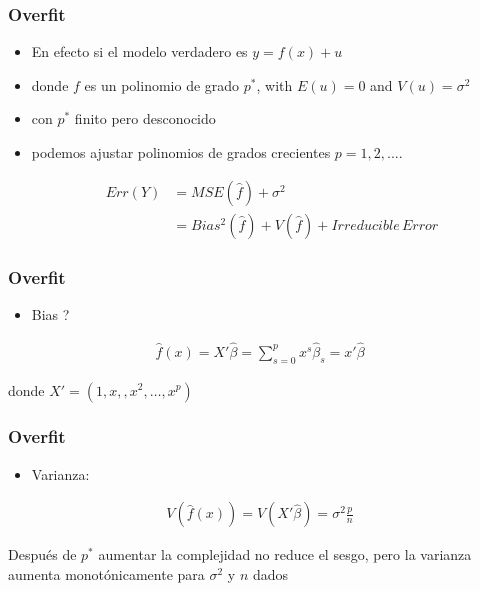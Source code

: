 \documentclass[
  shownotes,
  xcolor={svgnames},
  hyperref={colorlinks,citecolor=DarkBlue,linkcolor=DarkRed,urlcolor=DarkBlue}
  , aspectratio=169]{beamer}
\begin{document}
\begin{frame}[fragile]
\frametitle{Overfit}


\begin{itemize}

  \item En efecto si el modelo verdadero es $y=f(x) +u$ 
  \medskip
  \item donde $f$ es un polinomio de grado $p^*$, with $E(u)=0$ and $V(u)=\sigma^2$
  \medskip
  \item con $p^*$ finito pero desconocido
  \medskip
  \item  podemos ajustar polinomios de grados crecientes $p=1,2,....$
  
  \begin{align}
  Err (  Y )  &= MSE(\hat f) + \sigma^2  \\
                 &= Bias^2(\hat f) + V(\hat f)  + Irreducible\,Error        
  \end{align}

  
\end{itemize}

\end{frame}
\begin{frame}[fragile]
\frametitle{Overfit}


\begin{itemize}

  \item Bias ?

\end{itemize}

  \begin{align}
  \hat f(x) = X'\hat\beta=\sum_{s=0}^p x^s\hat\beta_s = x'\hat\beta  
  \end{align}

  donde $X'=(1,x,,x^2,\dots,x^p)$



\end{frame}
\begin{frame}[fragile]
\frametitle{Overfit}


\begin{itemize}

  \item Varianza:
\end{itemize}

 
  \begin{align}
  V(\hat f(x) ) = V(X'\hat\beta) = \sigma^2 \frac{p}{n}
  \end{align}

 

Después de  $p^*$ aumentar la complejidad no reduce el sesgo, pero la varianza aumenta monotónicamente para  $\sigma^2$ y $n$ dados
 
\end{frame}
\end{document}
